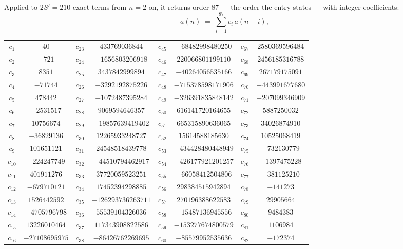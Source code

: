 \documentclass[11pt,a4paper]{article}
\theoremstyle{plain}
\theoremstyle{definition}
\begin{document}
Applied to $2S'=210$ exact terms from $n=2$ on, it returns order $87$ --- the
order the entry states --- with integer coefficients:
\[
a(n)\;=\;\sum_{i=1}^{87}c_i\,a(n-i),
\]
\begin{center}\small
\begin{tabular}{cccccccc}
$c_{1}$ & $40$ & $c_{23}$ & $433769036844$ & $c_{45}$ & $-68482998480250$ & $c_{67}$ & $2580369596484$ \\
$c_{2}$ & $-721$ & $c_{24}$ & $-1656803206918$ & $c_{46}$ & $220066801199110$ & $c_{68}$ & $2456185316788$ \\
$c_{3}$ & $8351$ & $c_{25}$ & $3437842999894$ & $c_{47}$ & $-40264056535166$ & $c_{69}$ & $267179175091$ \\
$c_{4}$ & $-71744$ & $c_{26}$ & $-3292192875226$ & $c_{48}$ & $-715378598171906$ & $c_{70}$ & $-443991677680$ \\
$c_{5}$ & $478442$ & $c_{27}$ & $-1072487395284$ & $c_{49}$ & $-326391835848142$ & $c_{71}$ & $-207099346909$ \\
$c_{6}$ & $-2531517$ & $c_{28}$ & $9069594646357$ & $c_{50}$ & $616141720164655$ & $c_{72}$ & $5887250032$ \\
$c_{7}$ & $10756674$ & $c_{29}$ & $-19857639419402$ & $c_{51}$ & $665315890636065$ & $c_{73}$ & $34026874910$ \\
$c_{8}$ & $-36829136$ & $c_{30}$ & $12265933248727$ & $c_{52}$ & $15614588185630$ & $c_{74}$ & $10525068419$ \\
$c_{9}$ & $101651121$ & $c_{31}$ & $24548518439778$ & $c_{53}$ & $-434428480448949$ & $c_{75}$ & $-732130779$ \\
$c_{10}$ & $-224247749$ & $c_{32}$ & $-44510794462917$ & $c_{54}$ & $-426177921201257$ & $c_{76}$ & $-1397475228$ \\
$c_{11}$ & $401911276$ & $c_{33}$ & $37720059523251$ & $c_{55}$ & $-66058412504806$ & $c_{77}$ & $-381125210$ \\
$c_{12}$ & $-679710121$ & $c_{34}$ & $17452394298885$ & $c_{56}$ & $298384515942894$ & $c_{78}$ & $-141273$ \\
$c_{13}$ & $1526442592$ & $c_{35}$ & $-126293736263711$ & $c_{57}$ & $270196388622583$ & $c_{79}$ & $29905664$ \\
$c_{14}$ & $-4705796798$ & $c_{36}$ & $55539104326036$ & $c_{58}$ & $-15487136945556$ & $c_{80}$ & $9484383$ \\
$c_{15}$ & $13226010464$ & $c_{37}$ & $117343908822586$ & $c_{59}$ & $-153277674800579$ & $c_{81}$ & $1106984$ \\
$c_{16}$ & $-27108695975$ & $c_{38}$ & $-86426762269695$ & $c_{60}$ & $-85579952535636$ & $c_{82}$ & $-172374$ \\

\end{tabular}
\end{center}
\end{document}
